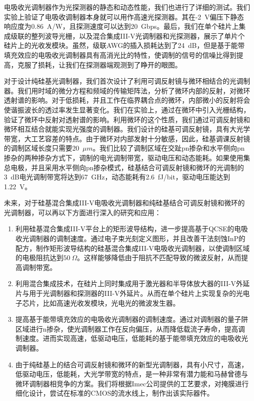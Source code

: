 电吸收光调制器作为光探测器的静态和动态性能，我们也进行了详细的测试。我们实验上验证了电吸收调制器本身就可以用作高速光探测器。其在-2~V偏压下静态响应度为0.86~A/W，且探测速度可以达到20~Gbps。最后，我们在单个硅片上集成级联的整列波导光栅，以及混合集成III-V光调制器和光探测器，展示了单片个硅片上的光收发模块。虽然，级联AWG的插入损耗达到了24~dB，但是基于能带填充效应的电吸收光调制器具有高消光比的特性，使调制的信号的信噪比得到提高，克服了损耗，让我们在探测器端观测到了睁开的眼图。

对于设计纯硅基光调制器，我们首次设计了利用可调反射镜与微环相结合的光调制器。我们用时域的微分方程和频域的传输矩阵法，分析了微环内部的反射，对微环透射谱的影响。对于低损耗，并且工作在临界耦合点的微环，内部微小的反射将会使谐振波长的透过率发生显著变化。我们在实验上，通过在微环中引入光栅结构，验证了微环中反射对透射谱的影响。利用微环的这个性质，我们通过可调反射镜和微环相互结合就能实现光强度的调制器。我们设计的硅基可调反射镜，具有大光学带宽，大工艺容差的特点。由于微环对内部发射十分敏感，因此，硅基调课反射镜的调制区域长度只需要20~$\mu m$。我们比较了调制区域在交趾pn掺杂和水平侧向pn掺杂的两种掺杂方式下，调制的电光调制带宽，驱动电压和动态能耗。如果使用集总电极，并且采用水平侧向pn掺杂模式，硅基结合可调反射镜和微环的光调制的3~dB电光调制带宽将达到67~GHz，动态能耗有2.6~fJ/bit，驱动电压能达到1.22~V。

未来，对于硅基混合集成III-V电吸收光调制器和纯硅基结合可调反射镜和微环的光调制器，可以再以下方面进行深入的研究和应用：
\begin{enumerate}[(1)]
	\item 利用硅基混合集成III-V平台上的矩形波导结构，进一步提高基于QCSE的电吸收光调制器的调制速度。通过电子束光刻定义图形，并且改善干法刻蚀InP的配方，制作矩形波导结构的硅基混合集成III-V电吸收光调制器，以使调制区域的电极阻抗达到$50~\Omega$。这样能够降低由于阻抗不匹配导致的微波反射，从而提高调制带宽。
	\item 利用混合集成技术，在硅片上同时集成用于激光器和半导体放大器的III-V外延片与用于光调制器和探测器的III-V外延片。从而在单个硅片上实现复杂的光电子芯片，比如高速光收发模块，光电光的微波发生器。
	\item 提高基于能带填充效应的电吸收光调制器的调制速度。通过对调制器的量子阱区域进行n掺杂，使光调制器工作在反向偏压，从而降低载流子寿命，提高调制速度。进而实现高速，低驱动电压，低能耗的基于能带填充效应的电吸收光调制器。
	\item 由于纯硅基上的结合可调反射镜和微环的新型光调制器，具有小尺寸，高速，低驱动电压，低能耗，大光学带宽的特点，是一种非常有潜力能和马赫曾德与微环调制器相竞争的方案。我们将根据Imec公司提供的工艺要求，对掩膜进行细化设计，尝试在标准的CMOS的流水线上，制作出该实际器件。
\end{enumerate}
